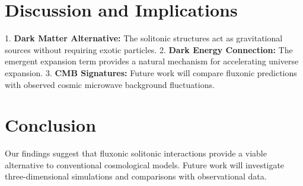 \documentclass{article}
\begin{document}
\section{Discussion and Implications}
1. \textbf{Dark Matter Alternative:} The solitonic structures act as gravitational sources without requiring exotic particles.
2. \textbf{Dark Energy Connection:} The emergent expansion term provides a natural mechanism for accelerating universe expansion.
3. \textbf{CMB Signatures:} Future work will compare fluxonic predictions with observed cosmic microwave background fluctuations.

\section{Conclusion}
Our findings suggest that fluxonic solitonic interactions provide a viable alternative to conventional cosmological models. Future work will investigate three-dimensional simulations and comparisons with observational data.
\end{document}
